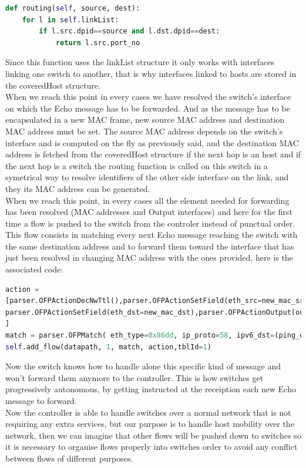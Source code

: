 \documentclass{article}
\begin{document}
\begin{lstlisting}[frame=single,language=Python, breaklines=true] 
def routing(self, source, dest):
    for l in self.linkList:
        if l.src.dpid==source and l.dst.dpid==dest:
            return l.src.port_no
\end{lstlisting}

Since this function uses the linkList structure it only works with
interfaces linking one switch to another, that is why interfaces
linked to hosts are stored in the coveredHost structure.\\
\newline
When we reach this point in every cases we have resolved the switch's
interface on which the Echo message has to be forwarded. And as the
message has to be encapsulated in a new MAC frame, new source MAC
address and destination MAC address must be set. The source MAC
address depends on the switch's interface and is computed on the fly
as previously said, and the destination MAC address is fetched from
the coveredHost structure if the next hop is an host and if the next
hop is a switch the routing function is called on this switch in a
symetrical way to resolve identifiers of the other side interface on
the link, and they its MAC address can be generated.\\
\newline
When we reach this point, in every cases all the element needed for
forwarding has been resolved (MAC addresses and Output interfaces) and
here for the first time a flow is pushed to the switch from the
controler instead of punctual order. This flow consists in matching
every next Echo message reaching the switch with the same destination
address and to forward them toward the interface that has just been
resolved in changing MAC address with the ones provided, here is the
associated code:

\begin{lstlisting}[frame=single,language=Python, breaklines=true] 
action =
[parser.OFPActionDecNwTtl(),parser.OFPActionSetField(eth_src=new_mac_src),
parser.OFPActionSetField(eth_dst=new_mac_dst),parser.OFPActionOutput(outputIntf)
]
match = parser.OFPMatch( eth_type=0x86dd, ip_proto=58, ipv6_dst=(ping_dst,'ffff:ffff:ffff:ffff:ffff:ffff:ffff:ffff'))
self.add_flow(datapath, 1, match, action,tblId=1)
\end{lstlisting}

Now the switch knows how to handle alone this specific kind of message
and won't forward them anymore to the controller. This is how switches
get progressively autonomous, by getting instructed at the receiption
each new Echo message to forward.\\
\newline
Now the controller is able to handle switches over a normal network
that is not requiring any extra services, but our purpose is to handle
host mobility over the network, then we can imagine that other flows
will be pushed down to switches so it is necessary to organise flows
properly into switches order to avoid any conflict between flows of
different purposes.
\end{document}
